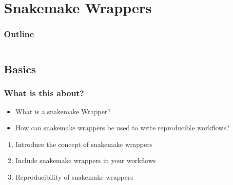 \section{Snakemake Wrappers}

\begin{frame}
    \frametitle{Outline}
    \begin{columns}[t]
        \begin{column}{.5\textwidth}
            \tableofcontents[sections={1-7},currentsection]
        \end{column}
        \begin{column}{.5\textwidth}
            \tableofcontents[sections={8-15},currentsection]
        \end{column}
    \end{columns}
\end{frame}

\subsection{Basics}

\begin{frame}
    \frametitle{What is this about?}
    \begin{question}[Questions]
        \begin{itemize}
            \item What is a snakemake Wrapper?
            \item How can snakemake wrappers be used to write reproducible workflows?
        \end{itemize}
    \end{question}
    \begin{docs}[Objectives]
        \begin{enumerate}
            \item Introduce the concept of snakemake wrappers
            \item Include snakemake wrappers in your workflows
            \item Reproducibility of snakemake wrappers
        \end{enumerate}
    \end{docs}
\end{frame}

